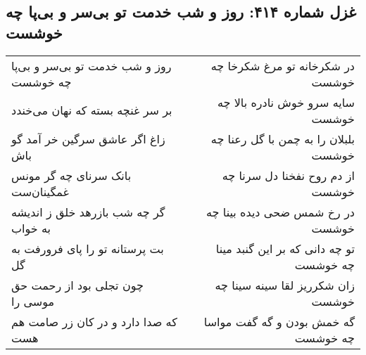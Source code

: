 \begin{center}
\section*{غزل شماره ۴۱۴: روز و شب خدمت تو بی‌سر و بی‌پا چه خوشست}
\label{sec:0414}
\begin{longtable}{l p{0.5cm} r}
روز و شب خدمت تو بی‌سر و بی‌پا چه خوشست
&&
در شکرخانه تو مرغ شکرخا چه خوشست
\\
بر سر غنچه بسته که نهان می‌خندد
&&
سایه سرو خوش نادره بالا چه خوشست
\\
زاغ اگر عاشق سرگین خر آمد گو باش
&&
بلبلان را به چمن با گل رعنا چه خوشست
\\
بانک سرنای چه گر مونس غمگینان‌ست
&&
از دم روح نفخنا دل سرنا چه خوشست
\\
گر چه شب بازرهد خلق ز اندیشه به خواب
&&
در رخ شمس ضحی دیده بینا چه خوشست
\\
بت پرستانه تو را پای فرورفت به گل
&&
تو چه دانی که بر این گنبد مینا چه خوشست
\\
چون تجلی بود از رحمت حق موسی را
&&
زان شکرریز لقا سینه سینا چه خوشست
\\
که صدا دارد و در کان زر صامت هم هست
&&
گه خمش بودن و گه گفت مواسا چه خوشست
\\
\end{longtable}
\end{center}
